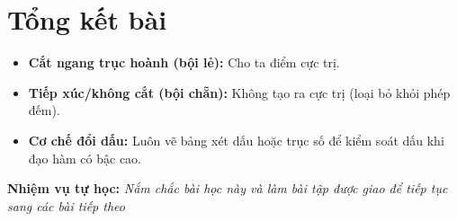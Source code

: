 \documentclass[12pt]{article}
\begin{document}
	\newpage
	
	\section{Tổng kết bài}
	
	\begin{tcolorbox}[colback=yellow!10!white, colframe=orange!60!black,
		fonttitle=\bfseries, title={Quy tắc "bỏ túi" khi tìm số điểm cực trị}]
		\begin{itemize}
			\item \textbf{Cắt ngang trục hoành (bội lẻ):} Cho ta điểm cực trị.
			\item \textbf{Tiếp xúc/không cắt (bội chẵn):} Không tạo ra cực trị (loại bỏ khỏi phép đếm).
			\item \textbf{Cơ chế đổi dấu:} Luôn vẽ bảng xét dấu hoặc trục số để kiểm soát dấu khi đạo hàm có bậc cao.
		\end{itemize}
	\end{tcolorbox}
	
	\vspace{3mm}
	\textbf{Nhiệm vụ tự học:} \textit{Nắm chắc bài học này và làm bài tập được giao để tiếp tục sang các bài tiếp theo}
	
\end{document}
